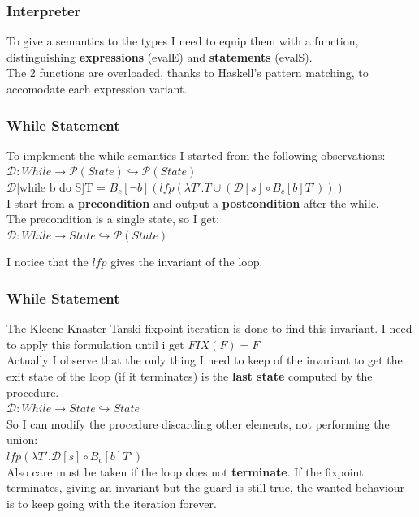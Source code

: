 \documentclass{beamer}
\begin{document}
\begin{frame}
	\frametitle{Interpreter}
	To give a semantics to the types I need to equip them with a function, distinguishing \textbf{expressions} (evalE) and \textbf{statements} (evalS). \\
	The 2 functions are overloaded, thanks to Haskell's pattern matching, to accomodate each expression variant.

\end{frame}

\begin{frame}
	\frametitle{While Statement}
	To implement the while semantics I started from the following observations: \\ \vspace{4mm}
	$\mathcal{D} : While \rightarrow \mathcal{P}(State) \hookrightarrow \mathcal{P}(State)$\\
	$\mathcal{D}$[while b do S]T = $B_c [\neg b](lfp(\lambda T'. T \cup (\mathcal{D}[s]\circ B_c[b]T')))$\\ \vspace{4mm}
	I start from a \textbf{precondition} and output a \textbf{postcondition} after the while. \\
	The precondition is a single state, so I get: \\ \vspace{4mm}
	$\mathcal{D} : While \rightarrow State \hookrightarrow \mathcal{P}(State)$\\ \vspace{4mm}
	
	I notice that the $lfp$ gives the invariant of the loop.
\end{frame} 
\begin{frame}
	\frametitle{While Statement}
	The Kleene-Knaster-Tarski fixpoint iteration is done to find this invariant. I need to apply this formulation until i get $FIX (F) = F$	\\ \vspace{4mm}
	Actually I observe that the only thing I need to keep of the invariant to get the exit state of the loop (if it terminates) is the \textbf{last state} computed by the procedure. \\ \vspace{4mm}
	$\mathcal{D} : While \rightarrow State \hookrightarrow State$\\ \vspace{4mm}
	So I can modify the procedure discarding other elements, not performing the union:\\ \vspace{4mm} 
	$lfp(\lambda T'. \mathcal{D}[s]\circ B_c[b]T')$ \\ \vspace{4mm}
	Also care must be taken if the loop does not \textbf{terminate}. If the fixpoint terminates, giving an invariant but the guard is still true, the wanted behaviour is to keep going with the iteration forever.
\end{frame}
\end{document}
